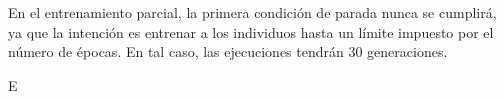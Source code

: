 \documentclass[spanish,a4paper,12pt,twoside]{report}
\begin{document}
  
  
  
  
  En el entrenamiento parcial, la primera condición de parada nunca se cumplirá, ya que la intención es entrenar a los individuos hasta un límite impuesto por el número de épocas. En tal caso, las ejecuciones tendrán 30 generaciones. \par
  E
  
  \chapter{\vspace{-3cm}{\LARGE 8. Conclusiones y líneas futuras}}
  \vfill
  
  \begin{thebibliography}{00}
  \vspace{-1cm}
  \makeatletter
  \def\@biblabel#1{}
  \let\old@bibitem\bibitem
  \def\bibitem#1{\old@bibitem{#1}\leavevmode\kern-\bibindent}
  \makeatother
  

\end{thebibliography}
\end{document}
